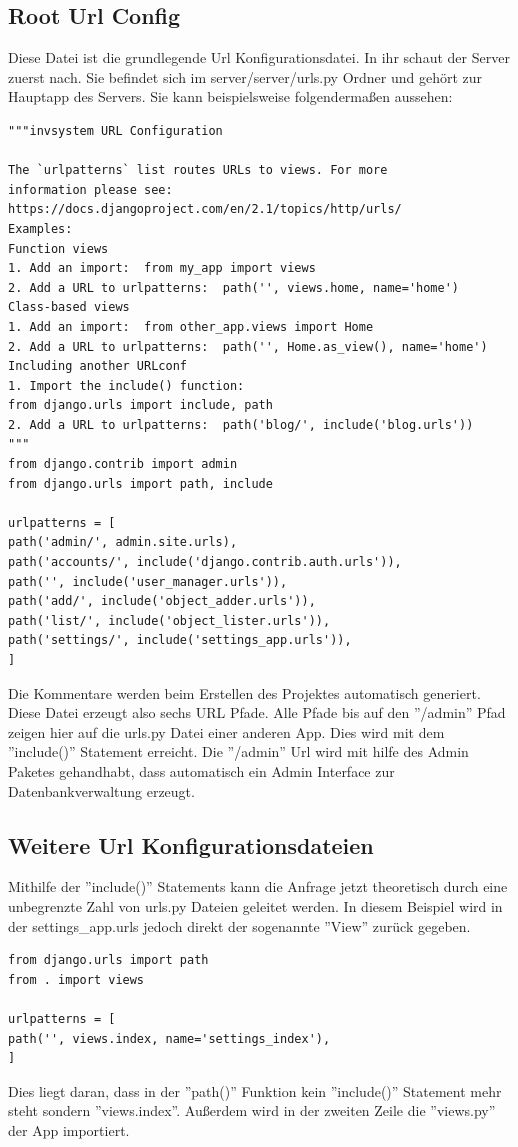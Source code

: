 \documentclass{article}
\begin{document}
\subsection{Root Url Config}
Diese Datei ist die grundlegende Url Konfigurationsdatei. In ihr schaut der Server zuerst nach. Sie befindet sich im server/server/urls.py Ordner und gehört zur Hauptapp des Servers. Sie kann beispielsweise folgendermaßen aussehen:
\begin{verbatim}
"""invsystem URL Configuration

The `urlpatterns` list routes URLs to views. For more
information please see:
https://docs.djangoproject.com/en/2.1/topics/http/urls/
Examples:
Function views
1. Add an import:  from my_app import views
2. Add a URL to urlpatterns:  path('', views.home, name='home')
Class-based views
1. Add an import:  from other_app.views import Home
2. Add a URL to urlpatterns:  path('', Home.as_view(), name='home')
Including another URLconf
1. Import the include() function: 
from django.urls import include, path
2. Add a URL to urlpatterns:  path('blog/', include('blog.urls'))
"""
from django.contrib import admin
from django.urls import path, include

urlpatterns = [
path('admin/', admin.site.urls),
path('accounts/', include('django.contrib.auth.urls')),
path('', include('user_manager.urls')),
path('add/', include('object_adder.urls')),
path('list/', include('object_lister.urls')),
path('settings/', include('settings_app.urls')),
]
\end{verbatim}
Die Kommentare werden beim Erstellen des Projektes automatisch generiert. Diese Datei erzeugt also sechs URL Pfade. Alle Pfade bis auf den ''/admin'' Pfad zeigen hier auf die urls.py Datei einer anderen App. Dies wird mit dem ''include()'' Statement erreicht. Die ''/admin'' Url wird mit hilfe des Admin Paketes gehandhabt, dass automatisch ein Admin Interface zur Datenbankverwaltung erzeugt. 
\subsection{Weitere Url Konfigurationsdateien}
Mithilfe der ''include()'' Statements kann die Anfrage jetzt theoretisch durch eine unbegrenzte Zahl von urls.py Dateien geleitet werden. In diesem Beispiel wird in der settings\_app.urls jedoch direkt der sogenannte ''View'' zurück gegeben.
\newpage
\begin{verbatim}
from django.urls import path
from . import views

urlpatterns = [
path('', views.index, name='settings_index'),
]
\end{verbatim}
Dies liegt daran, dass in der ''path()'' Funktion kein ''include()'' Statement mehr steht sondern ''views.index''. Außerdem wird in der zweiten Zeile die ''views.py'' der App importiert.
\end{document}
